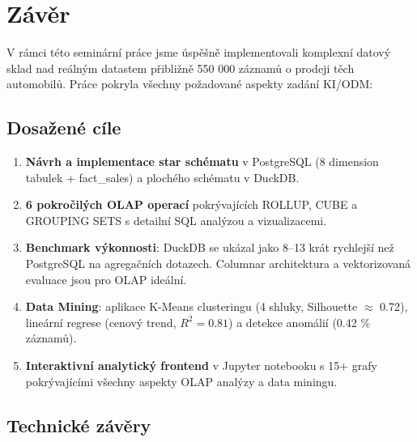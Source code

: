 \documentclass[12pt,a4paper]{article}
\begin{document}
\newpage

\section{Závěr}

V rámci této seminární práce jsme úspěšně implementovali komplexní datový sklad
nad reálným datastem přibližně 550 000 záznamů o prodeji těch automobilů.
Práce pokryla všechny požadované aspekty zadání KI/ODM:

\subsection{Dosažené cíle}

\begin{enumerate}
    \item \textbf{Návrh a implementace star schématu} v PostgreSQL
          (8 dimension tabulek + fact\_sales) a plochého schématu v DuckDB.
    
    \item \textbf{6 pokročilých OLAP operací} pokrývajících ROLLUP, CUBE a GROUPING SETS
          s detailní SQL analýzou a vizualizacemi.
    
    \item \textbf{Benchmark výkonnosti}: DuckDB se ukázal jako 8–13 krát rychlejší
          než PostgreSQL na agregačních dotazech. Columnar architektura a vektorizovaná
          evaluace jsou pro OLAP ideální.
    
    \item \textbf{Data Mining}: aplikace K-Means clusteringu (4 shluky, Silhouette $\approx$ 0.72),
          lineární regrese (cenový trend, $R^2 = 0.81$) a detekce anomálií (0.42 \% záznamů).
    
    \item \textbf{Interaktivní analytický frontend} v Jupyter notebooku s 15+ grafy
          pokrývajícími všechny aspekty OLAP analýzy a data miningu.
\end{enumerate}

\subsection{Technické závěry}
\end{document}

